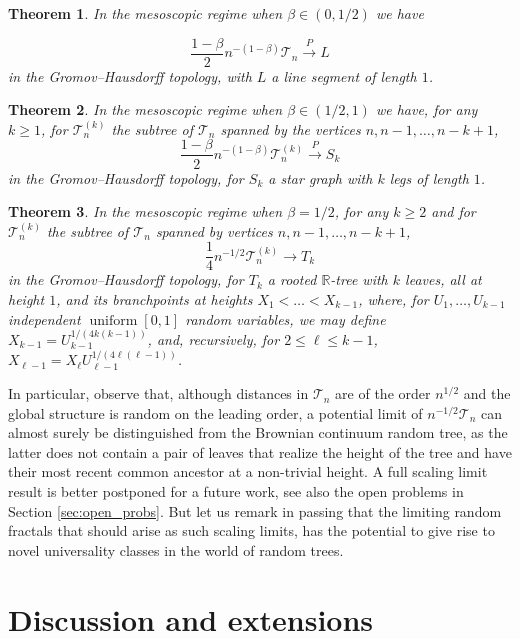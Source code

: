 \documentclass[letterpaper,11pt,reqno]{amsart}
\newtheorem{thm}{Theorem}[section]
\theoremstyle{definition}
\renewcommand{\le}{\leqslant}
\renewcommand{\ge}{\geqslant}
\newcommand{\convp}{\stackrel{P}{\longrightarrow}}
\begin{document}
{%
\begin{thm}\label{thm:ghp_meso}
In the mesoscopic regime when $\beta\in (0,1/2)$ we have 

\[\frac{1-\beta}{2} n^{-(1-\beta)}\mathcal{T}_n \convp L  \]
in the Gromov--Hausdorff topology, with $L$ a line segment of length $1$. 
\end{thm}

\begin{thm}\label{thm:meso_star}
In the mesoscopic regime when $\beta \in (1/2,1)$ we have, for any $k\ge 1$, for $\mathcal{T}^{(k)}_n$ the subtree of $\mathcal{T}_n$ spanned by the vertices $n, n-1, \dots, n-k+1$, 
\[\frac{1-\beta}{2} n^{-(1-\beta)}\mathcal{T}^{(k)}_n \convp S_k  \]
in the Gromov--Hausdorff topology, for $S_k$ a star graph with $k$ legs of length $1$. 
\end{thm}

\begin{thm}\label{thm:meso_not_crt}
    In the mesoscopic regime when $\beta=1/2$, for any $k\ge 2$ and for $\mathcal{T}^{(k)}_n$ the subtree of $\mathcal{T}_n$ spanned by vertices $n, n-1, \dots, n-k+1$, 
 \[\frac{1}{4} n^{-1/2}\mathcal{T}^{(k)}_n \to T_k  \]
    in the Gromov--Hausdorff topology, for $T_k$ a rooted $\mathbb{R}$-tree with $k$ leaves, all at height $1$, and its branchpoints at heights $X_1<\dots<X_{k-1}$, where, for $U_1,\dots,U_{k-1}$ independent $\operatorname{uniform}[0,1]$ random variables, we may define $X_{k-1}= U_{k-1}^{1/(4k(k-1))}$, and, recursively, for $2\le \ell \le k-1$, $X_{\ell-1}= X_\ell U_{\ell-1}^{1/(4\ell(\ell-1))}$. 
\end{thm}
In particular, observe that, although distances in $\mathcal{T}_n$ are of the order $n^{1/2}$ and the global structure is random on the leading order, a potential limit of $n^{-1/2}\mathcal{T}_n$ can almost surely be distinguished from the Brownian continuum random tree, as the latter does not contain a pair of leaves that realize the height of the tree and have their most recent common ancestor at a non-trivial height. A full scaling limit result is better postponed for a future work, see also the open problems in Section \ref{sec:open_probs}. But let us remark in passing that the limiting random fractals that should arise as such scaling limits, has the potential to give rise to novel universality classes in the world of random trees.}


\section{Discussion and extensions}
\label{sec:disc}
\end{document}
